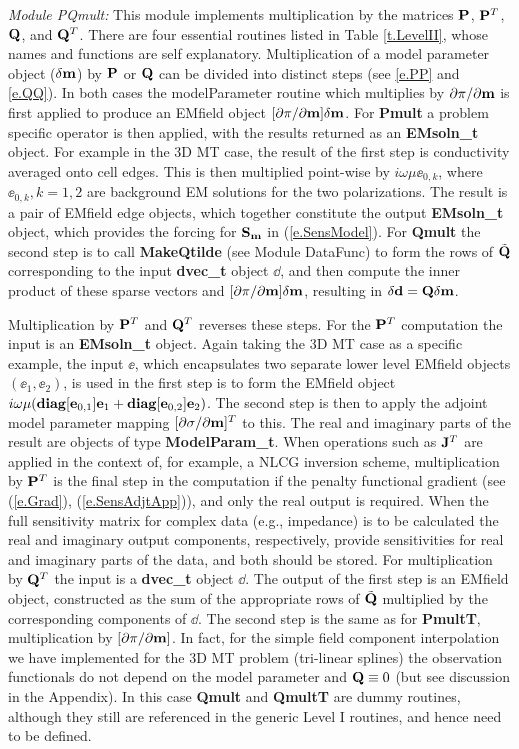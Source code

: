 \vspace{6pt}
\noindent
{\it Module PQmult:}  This module implements multiplication by the 
matrices ${\bf P}$, ${\bf P}^T$, ${\bf Q}$, and ${\bf Q}^T$.
There are four essential routines listed in Table
\ref{t.LevelII}, whose names and functions are self explanatory.  
Multiplication of a model parameter object ($\delta{\bf m}$)
by ${\bf P}$ or ${\bf Q}$  can be divided into distinct steps 
(see \ref{e.PP} and \ref{e.QQ}).
In both cases the modelParameter routine which multiplies
by $\partial\pi/\partial{\bf m}$ is first applied to produce an
EMfield object $[\partial\pi/\partial{\bf m}]\delta{\bf m}$.
For {\bf Pmult} a problem specific operator
is then applied, with the results returned as
an {\bf EMsoln\_t} object.
For example in the 3D MT case, the result of the first step
is conductivity averaged onto cell edges.
This is then multiplied point-wise
by $i\omega \mu \ee_{0,k}$, where
$\ee_{0,k}, k = 1,2$ are background EM solutions for the two
polarizations.  The result is a pair of 
EMfield edge objects, which together constitute
the output {\bf EMsoln\_t} object, which provides
the forcing for ${\bf S}_{\bf m}$ in (\ref{e.SensModel}).
For {\bf Qmult} the second step is to call {\bf MakeQtilde}
(see Module DataFunc) 
to form the rows of $\tilde{{\bf Q}}$ corresponding to the input
{\bf dvec\_t} object $\dd$, and
then compute the inner product of these sparse vectors and
$[\partial\pi/\partial{\bf m}]\delta{\bf m}$,
resulting in $\delta {\bf d} = {\bf Q}\delta{\bf m}$.

Multiplication by ${\bf P}^T$ and ${\bf Q}^T$
reverses these steps. For the ${\bf P}^T$ computation 
the input is an {\bf EMsoln\_t} object.
Again taking the 3D MT case as a specific example,
the input $\ee$, which encapsulates
two separate lower level EMfield objects $(\ee_1, \ee_2)$,
is used in the first step is to form the EMfield object
$i\omega\mu({\bf diag}[{\bf e}_{0,1}]{\bf e}_1+{\bf diag}[{\bf e}_{0,2}]{\bf e}_2)$.
The second step is then to apply the adjoint model parameter mapping
$[\partial\sigma/\partial{\bf m}]^T$ to this.
The real and imaginary parts of the result are objects
of type {\bf ModelParam\_t}.
When operations such as ${\bf J}^T$ are applied in the context of, for
example, a NLCG inversion scheme, 
multiplication by ${\bf P}^T$ is the final step in the computation
if the penalty functional gradient 
(see (\ref{e.Grad}), (\ref{e.SensAdjtApp})),
and only the real output is required.  
When the full sensitivity matrix
for complex data (e.g., impedance) 
is to be calculated the real and imaginary
output components, respectively,
provide sensitivities for real and imaginary parts of the data,
and both should be stored.
For multiplication by ${\bf Q}^T$ the input is a {\bf dvec\_t} object $\dd$.
The output of the first step 
is an EMfield object, constructed as the sum
of the appropriate rows of $\tilde{{\bf Q}}$
multiplied by the corresponding
components of $\dd$.  
The second step is the same as for {\bf PmultT},
multiplication by $[  \partial\pi/\partial{\bf m} ]$.
In fact, for the simple field component interpolation
we have implemented for the 3D MT problem 
(tri-linear splines) the observation functionals
do not depend on the model parameter and ${\bf Q} \equiv 0$
(but see discussion in the Appendix).  In this case
{\bf Qmult} and {\bf QmultT} are dummy routines,
although they still are referenced in the generic Level I routines,
and hence need to be defined.


